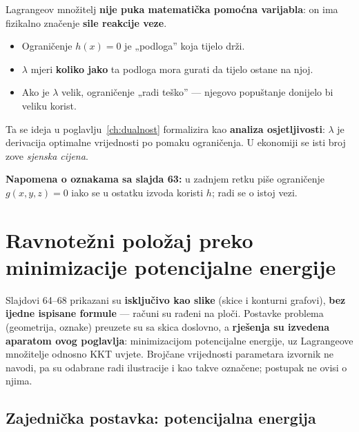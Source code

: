 \begin{napomena}
Lagrangeov množitelj \textbf{nije puka matematička pomoćna varijabla}: on ima
fizikalno značenje \textbf{sile reakcije veze}.

\begin{itemize}
  \item Ograničenje $h(x)=0$ je „podloga” koja tijelo drži.
  \item $\lambda$ mjeri \textbf{koliko jako} ta podloga mora gurati da tijelo
        ostane na njoj.
  \item Ako je $\lambda$ velik, ograničenje „radi teško” --- njegovo popuštanje
        donijelo bi veliku korist.
\end{itemize}

Ta se ideja u poglavlju~\ref{ch:dualnost} formalizira kao \textbf{analiza
osjetljivosti}: $\lambda$ je derivacija optimalne vrijednosti po pomaku
ograničenja. U ekonomiji se isti broj zove \emph{sjenska cijena}.
\end{napomena}

\textbf{Napomena o oznakama sa slajda 63:} u zadnjem retku piše ograničenje
$g(x,y,z) = 0$ iako se u ostatku izvoda koristi $h$; radi se o istoj vezi.

\section{Ravnotežni položaj preko minimizacije potencijalne energije}
\label{sec:ravnoteza}

\begin{napomena}
Slajdovi 64--68 prikazani su \textbf{isključivo kao slike} (skice i konturni
grafovi), \textbf{bez ijedne ispisane formule} --- računi su rađeni na ploči.
Postavke problema (geometrija, oznake) preuzete su sa skica doslovno, a
\textbf{rješenja su izvedena aparatom ovog poglavlja}: minimizacijom
potencijalne energije, uz Lagrangeove množitelje odnosno KKT uvjete. Brojčane
vrijednosti parametara izvornik ne navodi, pa su odabrane radi ilustracije i
kao takve označene; postupak ne ovisi o njima.
\end{napomena}

\subsection{Zajednička postavka: potencijalna energija}

